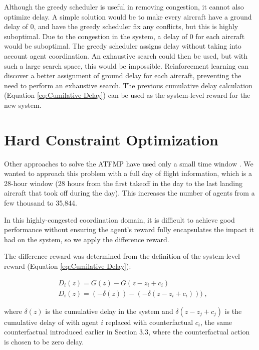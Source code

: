 \documentclass[onehalf,11pt]{beavtex}
\begin{document}
Although the greedy scheduler is useful in removing congestion, it cannot also optimize delay. A simple solution would be to make every aircraft have a ground delay of 0, and have the greedy scheduler fix any conflicts, but this is highly suboptimal. Due to the congestion in the system, a delay of 0 for each aircraft would be suboptimal. The greedy scheduler assigns delay without taking into account agent coordination. An exhaustive search could then be used, but with such a large search space, this would be impossible. Reinforcement learning can discover a better assignment of ground delay for each aircraft, preventing the need to perform an exhaustive search. The previous cumulative delay calculation (Equation \ref{eq:Cumilative Delay}) can be used as the system-level reward for the new system.

\section{Hard Constraint Optimization}
Other approaches to solve the ATFMP have used only a small time window \cite{6095996}. We wanted to approach this problem with a full day of flight information, which is a 28-hour window (28 hours from the first takeoff in the day to the last landing aircraft that took off during the day). This increases the number of agents from a few thousand to 35,844. 

In this highly-congested coordination domain, it is difficult to achieve good performance without ensuring the agent's reward fully encapsulates the impact it had on the system, so we apply the difference reward. 

The difference reward was determined from the definition of the system-level reward (Equation \ref{eq:Cumilative Delay}):

\begin{equation}
\begin{split}
&D_i(z) = G(z) - G(z - z_i + c_i) \\
&D_i(z) = (-\delta(z)) - (-\delta(z-z_i + c_i)))\;,
\end{split}
\end{equation}

where \textit{$\delta(z)$} is the cumulative delay in the system and \textit{$\delta(z-z_j + c_j)$} is the cumulative delay of with agent $i$ replaced with counterfactual \textit{$c_i$}, the same counterfactual introduced earlier in Section 3.3, where the counterfactual action is chosen to be zero delay.
\end{document}
